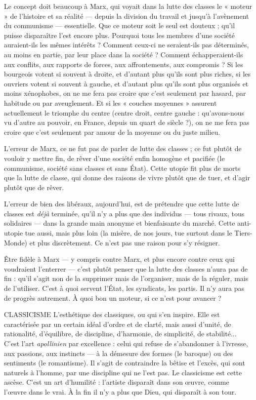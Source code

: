 Le concept doit beaucoup à Marx, qui voyait dans la lutte des classes le
« moteur » de l’histoire et sa réalité — depuis la division du travail et jusqu’à
l'avènement du communisme — essentielle. Que ce moteur soit le seul est
douteux ; qu’il puisse disparaître l’est encore plus. Pourquoi tous les membres
d’une société auraient-ils les mêmes intérêts ? Comment ceux-ci ne seraient-ils
pas déterminés, au moins en partie, par leur place dans la société ? Comment
échapperaient-ils aux conflits, aux rapports de forces, aux affrontements, aux
compromis ? Si les bourgeois votent si souvent à droite, et d’autant plus qu’ils
sont plus riches, si les ouvriers votent si souvent à gauche, et d’autant plus
qu’ils sont plus organisés et moins xénophobes, on ne me fera pas croire que
c’est seulement par hasard, par habitude ou par aveuglement. Et si les « couches
moyennes » assurent actuellement le triomphe du centre (centre droit, centre
gauche : qu’avons-nous vu d’autre au pouvoir, en France, depuis un quart de
siècle ?), on ne me fera pas croire que c’est seulement par amour de la moyenne
ou du juste milieu.

L'erreur de Marx, ce ne fut pas de parler de lutte des classes ; ce fut plutôt
de vouloir y mettre fin, de rêver d’une société enfin homogène et pacifiée (le
communisme, société sans classes et sans État). Cette utopie fit plus de morts
que la lutte de classe, qui donne des raisons de vivre plutôt que de tuer, et d’agir
plutôt que de rêver.

L'erreur de bien des libéraux, aujourd’hui, est de prétendre que cette lutte
de classes est {\it déjà} terminée, qu’il n’y a plus que des individus — tous rivaux,
tous solidaires — dans la grande main anonyme et bienfaisante du marché.
Cette anti-utopie tue aussi, mais plus loin (la misère, de nos jours, tue surtout
dans le Tiers-Monde) et plus discrètement. Ce n’est pas une raison pour s’y
résigner.

Être fidèle à Marx — y compris contre Marx, et plus encore contre ceux qui
voudraient l’enterrer — c’est plutôt penser que la lutte des classes n’aura pas de
fin : qu’il s’agit non de la supprimer mais de l’organiser, mais de la réguler,
mais de l'utiliser. C’est à quoi servent l’État, les syndicats, les partis. Il n’y aura
pas de progrès autrement. À quoi bon un moteur, si ce n’est pour avancer ?

CLASSICISME  L’esthétique des classiques, ou qui s’en inspire. Elle est
caractérisée par un certain idéal d’ordre et de clarté, mais
aussi d'unité, de rationalité, d'équilibre, de discipline, d'harmonie, de simplicité,
de stabilité... C’est l’art {\it apollinien} par excellence : celui qui refuse de
s’abandonner à l'ivresse, aux passions, aux instincts — à la démesure des formes
(le baroque) ou des sentiments (le romantisme). Il s’agit de contraindre la
bêtise et l’excès, qui sont naturels à l’homme, par une discipline qui ne l’est pas.
Le classicisme est cette ascèse. C’est un art d’humilité : l’artiste disparaît dans
son œuvre, comme l’œuvre dans le vrai. À la fin il n’y a plus que Dieu, qui disparaît
à son tour.

